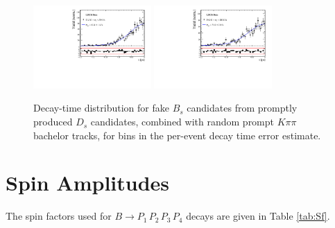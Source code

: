 \begin{figure}[h]
\includegraphics[height=!,width=0.4\textwidth]{figs/Resolution/SignalData_bin_7.pdf}
\includegraphics[height=!,width=0.4\textwidth]{figs/Resolution/SignalData_bin_8.pdf}
\caption{Decay-time distribution for fake $B_s$ candidates from promptly produced $D_s$ candidates, combined with random prompt $K\pi\pi$ bachelor tracks, for bins in the per-event decay time error estimate.}
\label{fig:}
\end{figure}




\clearpage
\clearpage\section{Spin Amplitudes} 
\label{a:sf}

The spin factors used for $B \to P_1 \, P_2 \, P_3 \, P_4$ decays are given in Table \ref{tab:Sf}.


